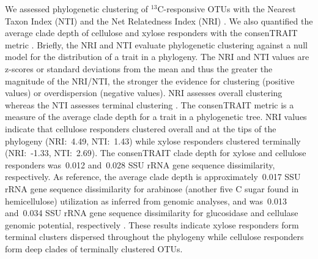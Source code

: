 We assessed phylogenetic clustering of $^{13}$C-responsive OTUs with the
Nearest Taxon Index (NTI) and the Net Relatedness Index (NRI)
\citep{Webb2000}. We also quantified the average clade depth of cellulose and
xylose responders with the consenTRAIT metric \citep{Martiny2013}. Briefly, the
NRI and NTI evaluate phylogenetic clustering against a null model for the
distribution of a trait in a phylogeny. The NRI and NTI values are z-scores or
standard deviations from the mean and thus the greater the magnitude of the
NRI/NTI, the stronger the evidence for clustering (positive values) or
overdispersion (negative values). NRI assesses overall clustering whereas the
NTI assesses terminal clustering \citep{Evans2014a}. The consenTRAIT metric is
a measure of the average clade depth for a trait in a phylogenetic tree. NRI
values indicate that cellulose responders clustered overall and at the tips of
the phylogeny (NRI:~4.49, NTI:~1.43) while xylose responders clustered
terminally (NRI:~-1.33, NTI:~2.69). The consenTRAIT clade depth for xylose and
cellulose responders was~0.012 and~0.028 SSU rRNA gene sequence dissimilarity,
respectively. As reference, the average clade depth is approximately~0.017 SSU
rRNA gene sequence dissimilarity for arabinose (another five C sugar found in
hemicellulose) utilization as inferred from genomic analyses, and was~0.013
and~0.034 SSU rRNA gene sequence dissimilarity for glucosidase and cellulase
genomic potential, respectively \citep{Martiny2013,Berlemont2013}. These
results indicate xylose responders form terminal clusters dispersed throughout
the phylogeny while cellulose responders form deep clades of terminally
clustered OTUs.
